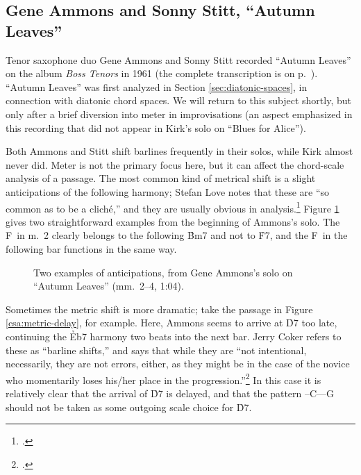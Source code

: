 \subsection{Gene Ammons and Sonny Stitt, “Autumn Leaves”}
\label{subsec:tenors-autumn-leaves}

Tenor saxophone duo Gene Ammons and Sonny Stitt recorded ``Autumn Leaves'' on
the album \emph{Boss Tenors} in 1961 (the complete transcription is on
p.~\pageref{transcription:autumn-leaves}). ``Autumn Leaves'' was first
analyzed in Section \ref{sec:diatonic-spaces}, in connection with diatonic
chord spaces. We will return to this subject shortly, but only after a brief
diversion into meter in improvisations (an aspect emphasized in this recording
that did not appear in Kirk's solo on ``Blues for Alice'').

Both Ammons and Stitt shift barlines frequently in their solos, while Kirk
almost never did. Meter is not the primary focus here, but it can affect the
chord-scale analysis of a passage. The most common kind of metrical
shift is a slight anticipations of the following harmony; Stefan Love notes
that these are ``so common as to be a cliché,'' and they are usually obvious
in analysis.\footcite[51]{love:2013} Figure \ref{csa:anticipation-simple}
gives two straightforward examples from the beginning of Ammons's solo. The
F\sharp\ in m.~2 clearly belongs to the following \h{Bm7} and not to \h{F7},
and the F\nat\ in the following bar functions in the same way.

\begin{figure}[tbp]
  \caption[Two examples of anticipations, from Gene Ammons's solo on ``Autumn
    Leaves.'']{Two examples of anticipations, from Gene Ammons's solo on
    ``Autumn Leaves'' (mm.~2--4, 1:04).}
  \label{csa:anticipation-simple}
\end{figure}

Sometimes the metric shift is more dramatic; take the passage in Figure
\ref{csa:metric-delay}, for example. Here, Ammons seems to arrive at \h{D7}
too late, continuing the \h{Eb7} harmony two beats into the next bar. Jerry
Coker refers to these as ``barline shifts,'' and says that while they are
``not intentional, necessarily, they are not errors, either, as they might be
in the case of the novice who momentarily loses his/her place in the
progression.''\footcite[83]{coker:elements} In this case it is relatively
clear that the arrival of \h{D7} is delayed, and that the pattern
\Dflat--C--\Bflat--G should not be taken as some outgoing scale choice for
\h{D7}.

